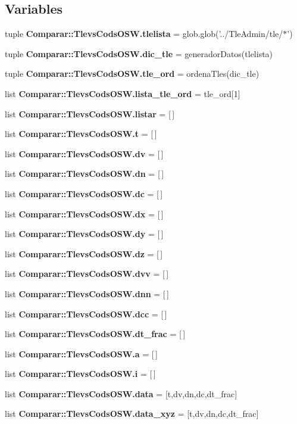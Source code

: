 \subsection*{\-Variables}
\begin{DoxyCompactItemize}
\item 
tuple {\bf \-Comparar\-::\-Tlevs\-Cods\-O\-S\-W.\-tlelista} = glob.\-glob('../\-Tle\-Admin/tle/$\ast$')
\item 
tuple {\bf \-Comparar\-::\-Tlevs\-Cods\-O\-S\-W.\-dic\-\_\-tle} = generador\-Datos(tlelista)
\item 
tuple {\bf \-Comparar\-::\-Tlevs\-Cods\-O\-S\-W.\-tle\-\_\-ord} = ordena\-Tles(dic\-\_\-tle)
\item 
list {\bf \-Comparar\-::\-Tlevs\-Cods\-O\-S\-W.\-lista\-\_\-tle\-\_\-ord} = tle\-\_\-ord[1]
\item 
list {\bf \-Comparar\-::\-Tlevs\-Cods\-O\-S\-W.\-listar} = [$\,$]
\item 
list {\bf \-Comparar\-::\-Tlevs\-Cods\-O\-S\-W.\-t} = [$\,$]
\item 
list {\bf \-Comparar\-::\-Tlevs\-Cods\-O\-S\-W.\-dv} = [$\,$]
\item 
list {\bf \-Comparar\-::\-Tlevs\-Cods\-O\-S\-W.\-dn} = [$\,$]
\item 
list {\bf \-Comparar\-::\-Tlevs\-Cods\-O\-S\-W.\-dc} = [$\,$]
\item 
list {\bf \-Comparar\-::\-Tlevs\-Cods\-O\-S\-W.\-dx} = [$\,$]
\item 
list {\bf \-Comparar\-::\-Tlevs\-Cods\-O\-S\-W.\-dy} = [$\,$]
\item 
list {\bf \-Comparar\-::\-Tlevs\-Cods\-O\-S\-W.\-dz} = [$\,$]
\item 
list {\bf \-Comparar\-::\-Tlevs\-Cods\-O\-S\-W.\-dvv} = [$\,$]
\item 
list {\bf \-Comparar\-::\-Tlevs\-Cods\-O\-S\-W.\-dnn} = [$\,$]
\item 
list {\bf \-Comparar\-::\-Tlevs\-Cods\-O\-S\-W.\-dcc} = [$\,$]
\item 
list {\bf \-Comparar\-::\-Tlevs\-Cods\-O\-S\-W.\-dt\-\_\-frac} = [$\,$]
\item 
list {\bf \-Comparar\-::\-Tlevs\-Cods\-O\-S\-W.\-a} = [$\,$]
\item 
list {\bf \-Comparar\-::\-Tlevs\-Cods\-O\-S\-W.\-i} = [$\,$]
\item 
list {\bf \-Comparar\-::\-Tlevs\-Cods\-O\-S\-W.\-data} = [t,dv,dn,dc,dt\-\_\-frac]
\item 
list {\bf \-Comparar\-::\-Tlevs\-Cods\-O\-S\-W.\-data\-\_\-xyz} = [t,dv,dn,dc,dt\-\_\-frac]

\end{DoxyCompactItemize}
